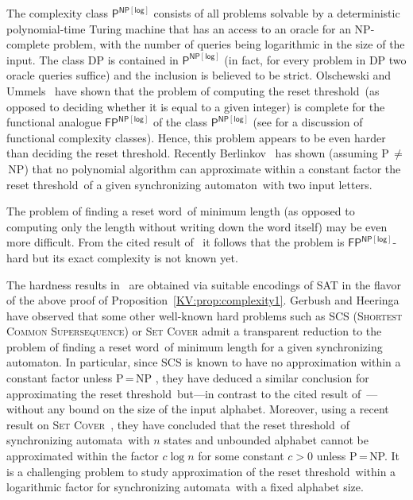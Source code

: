 \documentclass{irmaart}
\newcommand{\sa}{synchronizing au\-tom\-a\-ta}
\newcommand{\san}{synchronizing au\-tom\-a\-ton}
\newcommand{\sw}{reset word}
\newcommand{\rt}{reset threshold}
\theoremstyle{plain}
\begin{document}
The complexity class $\mathsf{P}^\mathsf{NP[log]}$ consists of all
problems solvable by a deterministic polynomial-time Turing
machine that has an access to an oracle for an
\textsf{NP}-complete problem, with the number of queries being
logarithmic in the size of the input. The class \textsf{DP} is
contained in $\mathsf{P}^\mathsf{NP[log]}$ (in fact, for every
problem in \textsf{DP} two oracle queries suffice) and the
inclusion is believed to be strict. Olschewski and
Ummels~\cite{Olschewski&Ummels:2010} have shown that the problem
of computing the \rt\ (as opposed to deciding whether it is equal
to a given integer) is complete for the functional analogue
$\mathsf{FP}^\mathsf{NP[log]}$ of the class
$\mathsf{P}^\mathsf{NP[log]}$ (see \cite{Selman:1994} for a
discussion of functional complexity classes). Hence, this problem
appears to be even harder than deciding the \rt. Recently
Berlinkov~\cite{Berlinkov:2010} has shown (assuming
\textsf{P}\,$\ne$\,\textsf{NP}) that no polynomial algorithm can
approximate within a constant factor the \rt\ of a given \san\
with two input letters.

The problem of finding a \sw\ of minimum length (as opposed to computing only
the length without writing down the word itself) may be even more difficult.
From the cited result of~\cite{Olschewski&Ummels:2010} it follows that the
problem is $\mathsf{FP}^\mathsf{NP[log]}$-hard but its exact complexity is not
known yet.

The hardness results
in~\cite{Berlinkov:2010,Olschewski&Ummels:2010} are obtained via
suitable encodings of \textsc{SAT} in the flavor of the above
proof of Proposition~\ref{KV:prop:complexity1}. Gerbush and
Heeringa~\cite{Gerbush&Heeringa:2011} have observed that some
other well-known hard problems such as \textsc{SCS}
(\textsc{Shortest Common Supersequence}) or \textsc{Set Cover}
admit a transparent reduction to the problem of finding a \sw\ of
minimum length for a given \san. In particular, since \textsc{SCS}
is known to have no approximation within a constant factor unless
\textsf{P}\,=\,\textsf{NP} \cite{Jiang&Li:1995}, they have deduced
a similar conclusion for approximating the \rt\ but---in contrast
to the cited result of~\cite{Berlinkov:2010}---without any bound
on the size of the input alphabet. Moreover, using a recent result
on \textsc{Set Cover}~\cite{Alon&Moshkovitz&Safra:2006}, they have
concluded that the \rt\ of \sa\ with $n$ states and unbounded
alphabet cannot be approximated within the factor $c\log n$ for
some constant $c>0$ unless \textsf{P}\,=\,\textsf{NP}. It is a
challenging problem to study approximation of the \rt\ within a
logarithmic factor for \sa\ with a fixed alphabet size.
\end{document}
